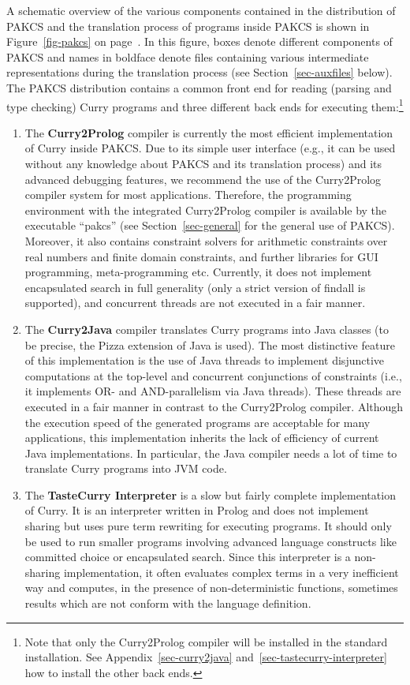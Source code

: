 \documentclass[11pt,fleqn]{article}
\renewcommand{\tt}{\usefont{OT1}{cmtt}{m}{n}\selectfont}
\newcommand{\codefont}{\tt}
\newcommand{\code}[1]{\mbox{\codefont #1}}
\newcommand{\ccode}[1]{``\mbox{\codefont #1}''}
\begin{document}
A schematic overview of the various components contained in
the distribution of PAKCS and the
translation process of programs inside PAKCS is shown in
Figure~\ref{fig-pakcs} on page~\pageref{fig-pakcs}.
In this figure, boxes denote different components of PAKCS
and names in boldface denote files containing
various intermediate representations during the translation
process (see Section~\ref{sec-auxfiles} below).
The PAKCS distribution contains a common front end for reading (parsing and
type checking) Curry programs and three different back ends
for executing them:\footnote{Note that only the Curry2Prolog compiler
will be installed in the standard installation. See
Appendix~\ref{sec-curry2java} and~\ref{sec-tastecurry-interpreter}
how to install the other back ends.}
\begin{enumerate}
\item
The {\bf Curry2Prolog}
compiler is currently the most efficient
implementation of Curry inside PAKCS. Due to its simple user interface
(e.g., it can be used without any knowledge about PAKCS and its
translation process) and its advanced debugging features,
we recommend the use of the Curry2Prolog compiler system
for most applications. Therefore, the programming environment
with the integrated Curry2Prolog compiler is available
by the executable \ccode{pakcs} (see Section~\ref{sec-general}
for the general use of PAKCS). Moreover, it also
contains constraint solvers for
arithmetic constraints over real numbers and finite domain constraints,
and further libraries for GUI programming, meta-programming etc.
Currently, it does not implement encapsulated search in full generality
(only a strict version of \code{findall} is supported),
and concurrent threads are not executed in a fair manner.
\item
The {\bf Curry2Java} compiler \cite{HanusSadre99JFLP}
translates Curry programs
into Java classes (to be precise, the Pizza extension \cite{OderskyWadler97}
of Java is used). The most distinctive feature of this implementation
is the use of Java threads to implement disjunctive computations
at the top-level and concurrent conjunctions of constraints
(i.e., it implements OR- and AND-parallelism via Java threads).
These threads are executed in a fair manner in contrast to
the Curry2Prolog compiler. Although the execution speed of
the generated programs are acceptable for many applications,
this implementation inherits the lack of efficiency
of current Java implementations. In particular, the Java compiler needs
a lot of time to translate Curry programs into JVM code.
\item
The {\bf TasteCurry Interpreter}
is a slow but fairly complete implementation
of Curry. It is an interpreter written in Prolog and does not
implement sharing but uses pure term rewriting for executing programs.
It should only be used to run smaller programs involving
advanced language constructs like committed choice or encapsulated search.
Since this interpreter is a non-sharing implementation, it often
evaluates complex terms in a very inefficient way and computes,
in the presence of
non-deterministic functions, sometimes results which are not
conform with the language definition.
\end{enumerate}
\end{document}
